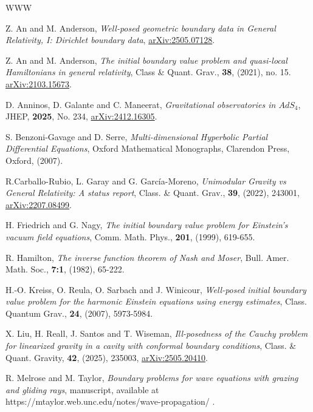 \documentclass[10pt]{amsart}
\newcommand{\<}{\langle}
\renewcommand{\>}{\rangle}
\theoremstyle{plain}
\theoremstyle{remark}
\theoremstyle{definition}
\numberwithin{equation}{section}
\begin{document}
\begin{thebibliography}{WWW}

\footnotesize 

 Z. An and M. Anderson, {\it Well-posed geometric boundary data in General Relativity, I: Dirichlet boundary data},
\href{https://arXiv.org/abs/2505.07128}{arXiv:2505.07128}. 

 Z. An and M. Anderson, {\it The initial boundary value problem and quasi-local Hamiltonians in general relativity}, 
Class \& Quant. Grav., {\bf 38},  (2021), no. 15. \href{https://arXiv.org/abs/2103.15673}{arXiv:2103.15673}. 

 D. Anninos, D. Galante and C. Maneerat, {\it Gravitational observatories in $AdS_4$}, 
JHEP, {\bf 2025}, No. 234, \href{https://arXiv.org/abs/2412.16305}{arXiv:2412.16305}.

 S. Benzoni-Gavage and D. Serre, {\it Multi-dimensional Hyperbolic Partial Differential Equations}, Oxford 
Mathematical Monographs, Clarendon Press, Oxford, (2007).  
 
  R.Carballo-Rubio, L. Garay and G. García-Moreno, {\it Unimodular Gravity vs General Relativity: A status report}, 
Class. \& Quant. Grav., {\bf 39}, (2022), 243001, \href{https://arXiv.org/abs/2207.08499}{arXiv:2207.08499}.
 
 H. Friedrich and G. Nagy, {\it The initial boundary value problem for Einstein's vacuum field equations}, 
Comm. Math. Phys., {\bf 201}, (1999), 619-655. 

  R. Hamilton, {\it The inverse function theorem of Nash and Moser}, Bull. Amer. Math. Soc., {\bf 7:1}, (1982), 65-222. 
 
 H.-O. Kreiss, O. Reula, O. Sarbach and J. Winicour, {\it Well-posed initial boundary value problem for the 
harmonic Einstein equations using energy estimates}, Class. Quantum Grav., {\bf 24}, (2007), 5973-5984.

 X. Liu, H. Reall, J. Santos and T. Wiseman, {\it Ill-posedness of the Cauchy problem for linearized gravity in a cavity with 
conformal boundary conditions}, Class. \& Quant. Gravity, {\bf 42}, (2025), 235003, \href{https://arXiv.org/abs/2505.20410}{arXiv:2505.20410}.

 R. Melrose and M. Taylor, {\it Boundary problems for wave equations with grazing and gliding rays}, 
manuscript, available at https://mtaylor.web.unc.edu/notes/wave-propagation/ .


\end{thebibliography}
\end{document}
